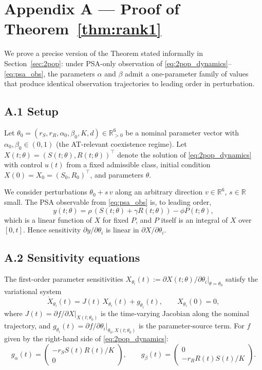 \documentclass[11pt]{article}
\newcommand{\R}{\mathbb{R}}
\begin{document}
\appendix

\section*{Appendix A --- Proof of Theorem~\ref{thm:rank1}}

We prove a precise version of the Theorem stated informally in
Section~\ref{sec:2pop}: under PSA-only observation of
\eqref{eq:2pop_dynamics}--\eqref{eq:psa_obs}, the parameters $\alpha$ and $\beta$
admit a one-parameter family of values that produce identical observation
trajectories to leading order in perturbation.

\subsection*{A.1 Setup}

Let $\theta_0 = (r_S, r_R, \alpha_0, \beta_0, K, d) \in \R^6_{>0}$ be a nominal
parameter vector with $\alpha_0, \beta_0 \in (0, 1)$ (the AT-relevant coexistence
regime). Let $X(t; \theta) = (S(t; \theta), R(t; \theta))^\top$ denote the
solution of \eqref{eq:2pop_dynamics} with control $u(t)$ from a fixed admissible
class, initial condition $X(0) = X_0 = (S_0, R_0)^\top$, and parameters $\theta$.

We consider perturbations $\theta_0 + s\, v$ along an arbitrary direction
$v \in \R^6$, $s \in \R$ small. The PSA observable from \eqref{eq:psa_obs} is,
to leading order,
\begin{equation*}
y(t; \theta) = \rho\,(S(t; \theta) + \gamma R(t; \theta)) - \phi P(t; \theta),
\end{equation*}
which is a linear function of $X$ for fixed $P$, and $P$ itself is an integral
of $X$ over $[0, t]$. Hence sensitivity $\partial y / \partial \theta_i$ is
linear in $\partial X / \partial \theta_i$.

\subsection*{A.2 Sensitivity equations}

The first-order parameter sensitivities
$X_{\theta_i}(t) := \partial X(t; \theta) / \partial \theta_i |_{\theta = \theta_0}$
satisfy the variational system
\begin{equation*}
\dot{X}_{\theta_i}(t) = J(t)\, X_{\theta_i}(t) + g_{\theta_i}(t), \qquad X_{\theta_i}(0) = 0,
\end{equation*}
where $J(t) = \partial f / \partial X |_{X(t; \theta_0)}$ is the time-varying
Jacobian along the nominal trajectory, and
$g_{\theta_i}(t) = \partial f / \partial \theta_i |_{\theta_0, X(t; \theta_0)}$
is the parameter-source term. For $f$ given by the right-hand side of
\eqref{eq:2pop_dynamics}:
\begin{equation*}
g_\alpha(t) = \begin{pmatrix} -r_S S(t) R(t) / K \\ 0 \end{pmatrix},
\qquad
g_\beta(t) = \begin{pmatrix} 0 \\ -r_R R(t) S(t) / K \end{pmatrix}.
\end{equation*}
\end{document}
